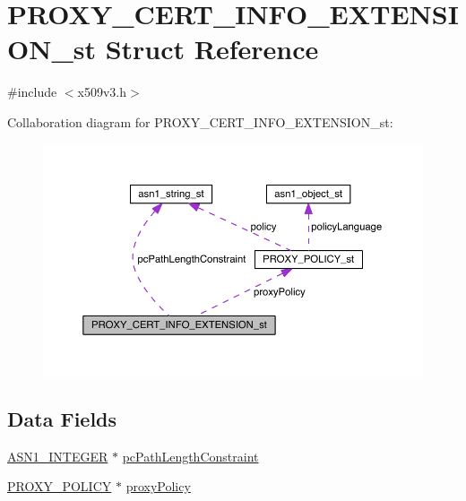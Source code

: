 \hypertarget{struct_p_r_o_x_y___c_e_r_t___i_n_f_o___e_x_t_e_n_s_i_o_n__st}{}\section{P\+R\+O\+X\+Y\+\_\+\+C\+E\+R\+T\+\_\+\+I\+N\+F\+O\+\_\+\+E\+X\+T\+E\+N\+S\+I\+O\+N\+\_\+st Struct Reference}
\label{struct_p_r_o_x_y___c_e_r_t___i_n_f_o___e_x_t_e_n_s_i_o_n__st}


{\ttfamily \#include $<$x509v3.\+h$>$}



Collaboration diagram for P\+R\+O\+X\+Y\+\_\+\+C\+E\+R\+T\+\_\+\+I\+N\+F\+O\+\_\+\+E\+X\+T\+E\+N\+S\+I\+O\+N\+\_\+st\+:\nopagebreak
\begin{figure}[H]
\begin{center}
\leavevmode
\includegraphics[width=350pt]{struct_p_r_o_x_y___c_e_r_t___i_n_f_o___e_x_t_e_n_s_i_o_n__st__coll__graph}
\end{center}
\end{figure}
\subsection*{Data Fields}
\begin{DoxyCompactItemize}
\item 
\hyperlink{crypto_2ossl__typ_8h_af4335399bf9774cb410a5e93de65998b}{A\+S\+N1\+\_\+\+I\+N\+T\+E\+G\+ER} $\ast$ \hyperlink{struct_p_r_o_x_y___c_e_r_t___i_n_f_o___e_x_t_e_n_s_i_o_n__st_a2dc7536cd57d0e405c0fe14ce9a5eb41}{pc\+Path\+Length\+Constraint}
\item 
\hyperlink{crypto_2x509v3_2x509v3_8h_afe0e9f86d459df9228819f55834a5cf0}{P\+R\+O\+X\+Y\+\_\+\+P\+O\+L\+I\+CY} $\ast$ \hyperlink{struct_p_r_o_x_y___c_e_r_t___i_n_f_o___e_x_t_e_n_s_i_o_n__st_a26e27ddd709b05778b36002c36fee1c2}{proxy\+Policy}
\end{DoxyCompactItemize}



